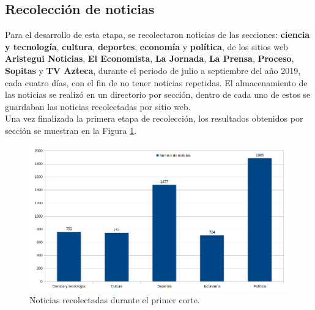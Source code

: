 \begin{table}[H]
\centering
{}
\caption{Ejemplo de estructura de un archivo CSV}
\label{tab:csv}
\end{table}

\subsection{Recolección de noticias}

Para el desarrollo de esta etapa, se recolectaron noticias de las secciones: \textbf{ciencia y tecnología}, \textbf{cultura}, \textbf{deportes}, \textbf{economía} y \textbf{política}, de los sitios web \textbf{Aristegui Noticias}, \textbf{El Economista}, \textbf{La Jornada}, \textbf{La Prensa}, \textbf{Proceso}, \textbf{Sopitas} y \textbf{TV Azteca}, durante el periodo de julio a septiembre del año 2019, cada cuatro días, con el fin de no tener noticias repetidas. El almacenamiento de las noticias se realizó en un directorio por sección, dentro de cada uno de estos se guardaban las noticias recolectadas por sitio web.\\

Una vez finalizada la primera etapa de recolección, los resultados obtenidos por sección se muestran en la Figura  \ref{Fig:notseccionV1}.
\begin{figure}[H]
	\centering
	\includegraphics[scale=.4]{imagenes/Capitulo5/noticiasPorSeccionV1.png}
	\caption{Noticias recolectadas durante el primer corte.}
	\label{Fig:notseccionV1}
\end{figure}

